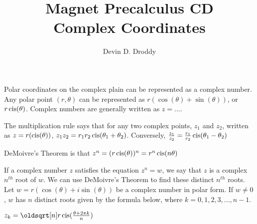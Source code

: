 \documentclass{report}
\title{\Huge{Magnet Precalculus CD}\\Complex Coordinates}
\author{\huge{Devin D. Droddy}}
\date{}
\begin{document}
\maketitle
\newpage%
\tableofcontents
\pagebreak

\chapter{}
\section{}
Polar coordinates on the complex plain can be represented as a complex number. Any polar point $(r,\theta)$ can be represented as $r(\cos(\theta) + \sin(\theta))$, or $r\operatorname{cis}(\theta)$. Complex numbers are generally written as $z=...$.

The multiplication rule says that for any two complex points, $z_1$ and $z_2$, written as $z=r(\operatorname{cis}(\theta))$, $z_1z_2=r_1r_2\operatorname{cis}(\theta_1+\theta_2)$. Conversely, $\frac{z_1}{z_2}=\frac{r_1}{r_2}\operatorname{cis}(\theta_1-\theta_2)$

DeMoivre's Theorem is that $z^n=(r\operatorname{cis}(\theta))^n=r^n\operatorname{cis}(n\theta)$

If a complex number $z$ satisfies the equation $z^n=w$, we say that $z$ is a complex $n^{th}$ root of $w$. We can use DeMoivre's Theorem to find these distinct $n^{th}$ roots. Let $w=r(\cos(\theta)+i\sin(\theta))$ be a complex number in polar form. If $w\neq0$, $w$ has $n$ distinct roots given by the formula below, where $k=0,1,2,3,...,n-1$.

$z_k=\sqrt[n]{r}\cis(\frac{\theta+2\pi k}{n})$
\end{document}
